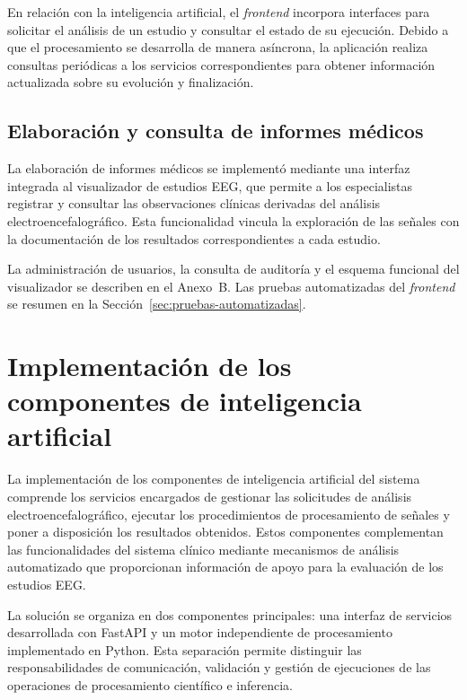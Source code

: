 En relación con la inteligencia
artificial, el \textit{frontend} incorpora
interfaces para solicitar el análisis
de un estudio y consultar el estado
de su ejecución. Debido a que el
procesamiento se desarrolla de manera
asíncrona, la aplicación realiza
consultas periódicas a los servicios
correspondientes para obtener
información actualizada sobre
su evolución y finalización.

\subsection{Elaboración y consulta de informes médicos}

La elaboración de informes médicos se implementó
mediante una interfaz integrada al visualizador
de estudios EEG, que permite a los especialistas
registrar y consultar las observaciones clínicas
derivadas del análisis electroencefalográfico.
Esta funcionalidad vincula la exploración de las
señales con la documentación de los resultados
correspondientes a cada estudio.

\begin{nuevotexto}
La administración de usuarios, la consulta de auditoría y el esquema funcional del visualizador se describen en el Anexo~B.
Las pruebas automatizadas del \textit{frontend} se resumen en la Sección~\ref{sec:pruebas-automatizadas}.
\end{nuevotexto}

\section{Implementación de los componentes de inteligencia artificial}

La implementación de los componentes de inteligencia artificial
del sistema comprende los servicios encargados de gestionar
las solicitudes de análisis electroencefalográfico, ejecutar
los procedimientos de procesamiento de señales y poner a
disposición los resultados obtenidos. Estos componentes
complementan las funcionalidades del sistema clínico mediante
mecanismos de análisis automatizado que proporcionan
información de apoyo para la evaluación de los estudios EEG.

La solución se organiza en dos componentes principales:
una interfaz de servicios desarrollada con FastAPI y un
motor independiente de procesamiento implementado en Python.
Esta separación permite distinguir las responsabilidades
de comunicación, validación y gestión de ejecuciones de
las operaciones de procesamiento científico e inferencia.

